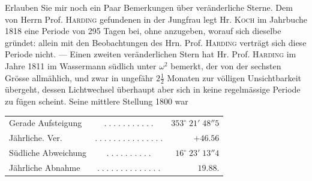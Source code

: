 \par\indent Erlauben Sie mir noch ein Paar Bemerkungen über veränderliche Sterne. Dem von Herrn Prof. \textsc{Harding} gefundenen in der Jungfrau legt Hr. \textsc{Koch} im Jahrbuche 1818 eine Periode von 295 Tagen bei, ohne anzugeben, worauf sich dieselbe gründet: allein mit den Beobachtungen des Hrn. Prof. \textsc{Harding} verträgt sich diese Periode nicht. — Einen zweiten veränderlichen Stern hat Hr. Prof. \textsc{Harding} im Jahre 1811 im Wassermann südlich unter $\omega^2$ bemerkt, der von der sechsten Grösse allmählich, und zwar in ungefähr $2\frac12$ Monaten zur völligen Unsichtbarkeit übergeht, dessen Lichtwechsel überhaupt aber sich in keine regelmässige Periode zu fügen scheint. Seine mittlere Stellung 1800 war
\begin{center}\fontsize{10}{12}\selectfont\setlength{\tabcolsep}{3pt}\begin{tabular}{lcr}
Gerade Aufsteigung & $.\;.\;.\;.\;.\;.\;.\;.\;.\;.\;.$ & $353^\circ\;21'\;48''5$\\
Jährliche. Ver. & $.\;.\;.\;.\;.\;.\;.\;.\;.\;.\;.\;.\;.\;.\;.$ & $+46.56$\\
Südliche Abweichung & $.\;.\;.\;.\;.\;.\;.\;.\;.\;.$ & $16^\circ\;23'\;13''4$\\
Jährliche Abnahme & $.\;.\;.\;.\;.\;.\;.\;.\;.\;.\;.\;.\;.\;.$ & $19.88$.\\
\end{tabular}\end{center}
